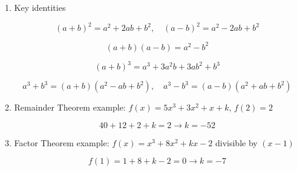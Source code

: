 1. Key identities

$$ (a+b)^2 = a^2+2ab+b^2, \quad (a-b)^2 = a^2-2ab+b^2 $$

$$ (a+b)(a-b) = a^2-b^2 $$

$$ (a+b)^3 = a^3+3a^2b+3ab^2+b^3 $$

$$ a^3+b^3 = (a+b)(a^2-ab+b^2), \quad a^3-b^3 = (a-b)(a^2+ab+b^2) $$

2. Remainder Theorem example: $f(x) = 5x^3+3x^2+x+k$, $f(2) = 2$

$$ 40+12+2+k=2 \rightarrow k=-52 $$

3. Factor Theorem example: $f(x) = x^3+8x^2+kx-2$ divisible by $(x-1)$

$$ f(1) = 1+8+k-2 = 0 \rightarrow k=-7 $$
